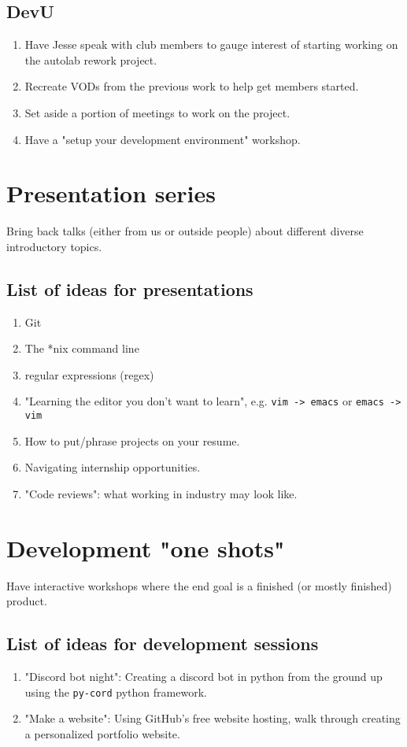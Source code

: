 \documentclass{article}
\begin{document}
\subsection{DevU}
\begin{enumerate}
    \item Have Jesse speak with club members to gauge interest of starting working on the autolab rework project.
    \item Recreate VODs from the previous work to help get members started.
    \item Set aside a portion of meetings to work on the project.
    \item Have a "setup your development environment" workshop.
\end{enumerate}
\clearpage
\section{Presentation series}
Bring back talks (either from us or outside people) about different diverse introductory topics.
\subsection{List of ideas for presentations}
\begin{enumerate}
    \item Git
    \item The *nix command line
    \item regular expressions (regex)
    \item "Learning the editor you don't want to learn", e.g. \verb|vim -> emacs| or \verb|emacs -> vim|
    \item How to put/phrase projects on your resume.
    \item Navigating internship opportunities.
    \item "Code reviews": what working in industry may look like.
\end{enumerate}

\section{Development "one shots"}
Have interactive workshops where the end goal is a finished (or mostly finished) product.
\subsection{List of ideas for development sessions}
\begin{enumerate}
    \item "Discord bot night": Creating a discord bot in python from the ground up using the \verb|py-cord| python framework.
    \item "Make a website": Using GitHub's free website hosting, walk through creating a personalized portfolio website.
\end{enumerate}
\end{document}
